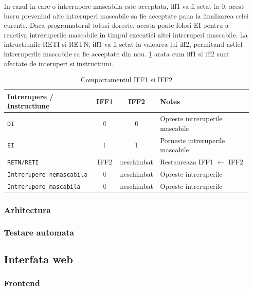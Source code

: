 \documentclass[titlepage,12pt]{article}
\DeclareRobustCommand{\code}[1]{{\ttfamily\small #1}}
\begin{document}
In cazul in care o intrerupere mascabila este acceptata, \code{iff1} va fi setat la 0, acest lucru prevenind alte intreruperi mascabile sa fie acceptate pana la finalizarea celei curente. Daca programatorul totusi doreste, acesta poate folosi \code{EI} pentru a reactiva intreruperile mascabile in timpul executiei altei intreruperi mascabile.
La intructiunile \code{RETI} si \code{RETN}, \code{iff1} va fi setat la valoarea lui \code{iff2}, permitand astfel intreruperile mascabile sa fie acceptate din nou.
\cref{tab:iff1iff2-interaction} arata cum \code{iff1} si \code{iff2} sunt afectate de interuperi si instructiuni.

\begin{table}[h!]
\centering
\begin{tabular}{|l|c|c|l|}
\hline
\textbf{Intrerupere / Instructiune} & \textbf{IFF1} & \textbf{IFF2} & \textbf{Notes} \\
\hline
\texttt{DI}                   & 0            & 0             & Opreste intreruperile mascabile \\
\texttt{EI}                   & 1            & 1             & Porneste intreruperile mascabile \\
\texttt{RETN/RETI}            & IFF2     & neschimbat     & Restaureaza IFF1 $\leftarrow$ IFF2 \\
\hline
\texttt{Intrerupere nemascabila} & 0         & neschimbat     & Opreste intreruperile \\
\texttt{Intrerupere mascabila}   & 0         & neschimbat     & Opreste intreruperile \\
\hline
\end{tabular}
\caption{Comportamentul \code{IFF1} si \code{IFF2}}
\label{tab:iff1iff2-interaction}
\end{table}

\subsubsection{Arhitectura}
\subsubsection{Testare automata}
\subsection{Interfata web}
\subsubsection{Frontend}
\end{document}
